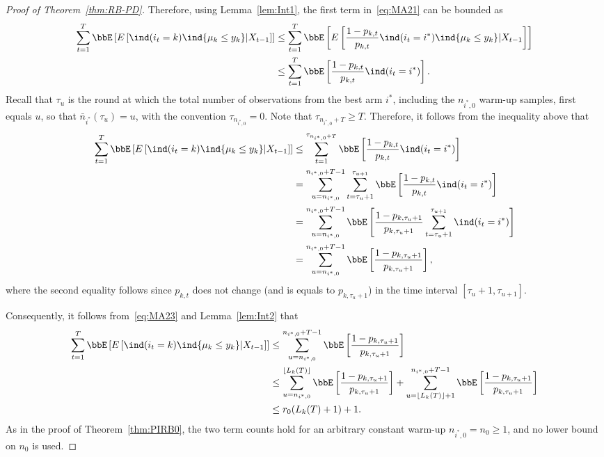 \documentclass[11pt]{article}
\begin{document}
\begin{proof}[Proof of Theorem~\ref{thm:RB-PD}]
    Therefore, using Lemma~\ref{lem:Int1}, the first term in~\eqref{eq:MA21} can be bounded as
    \begin{align}
        \nonumber
      \sum_{t=1}^{T} \bbE \left[ E\left[  \ind(i_t=k )  \ind\{\mu_k \leq y_k  \}  | X_{t-1}  \right] \right] &\leq \sum_{t=1}^{T} \bbE \left[ E\left[  \frac{1-p_{k,t}}{p_{k,t}} \ind(i_t=i^* )  \ind\{\mu_k \leq y_k  \}  | X_{t-1}  \right] \right]
      \\
      &\leq \sum_{t=1}^{T} \bbE \left[   \frac{1-p_{k,t}}{p_{k,t}} \ind(i_t=i^* )   \right].
    \end{align}
    Recall that $\tau_u$ is the round at which the total number of observations from the best arm $i^*$, including the $n_{i^*,0}$ warm-up samples, first equals $u$, so that $\bar n_{i^*}(\tau_u) = u$, with the convention $\tau_{n_{i^*,0}} = 0$. Note that $\tau_{n_{i^*,0}+T} \geq T$. Therefore, it follows from the inequality above that
    \begin{align}
        \nonumber
      \sum_{t=1}^{T} \bbE \left[ E\left[  \ind(i_t=k )  \ind\{\mu_k \leq y_k  \}  | X_{t-1}  \right] \right] &\leq \sum_{t=1}^{\tau_{n_{i^*,0}+T}} \bbE \left[   \frac{1-p_{k,t}}{p_{k,t}} \ind(i_t=i^* )   \right]
      \\
      \nonumber
      &= \sum_{u=n_{i^*,0}}^{n_{i^*,0}+T-1} \sum_{t=\tau_{u}+1}^{\tau_{u+1}}  \bbE \left[   \frac{1-p_{k,t}}{p_{k,t}}  \ind(i_t=i^* )   \right]
      \\
      \nonumber
      &= \sum_{u=n_{i^*,0}}^{n_{i^*,0}+T-1}  \bbE \left[   \frac{1-p_{k,\tau_{u}+1}}{p_{k,\tau_{u}+1}}  \sum_{t=\tau_{u}+1}^{\tau_{u+1}}  \ind(i_t=i^* )   \right]
      \\
      &= \sum_{u=n_{i^*,0}}^{n_{i^*,0}+T-1}  \bbE \left[   \frac{1-p_{k,\tau_{u}+1}}{p_{k,\tau_{u}+1}}     \right] ,
      \label{eq:MA23}
    \end{align}
    where the second equality follows since $p_{k,t}$ does not change (and is equals to $p_{k,\tau_{u}+1}$) in the time interval $[\tau_{u}+1,\tau_{u+1}]$. 

    Consequently, it follows from~\eqref{eq:MA23} and Lemma~\ref{lem:Int2} that
   \begin{align}
    \nonumber
    \sum_{t=1}^{T} \bbE \left[ E\left[  \ind(i_t=k )  \ind\{\mu_k \leq y_k  \}  | X_{t-1}  \right] \right] &\leq \sum_{u=n_{i^*,0}}^{n_{i^*,0}+T-1}  \bbE \left[   \frac{1-p_{k,\tau_{u}+1}}{p_{k,\tau_{u}+1}}     \right] 
    \\
    \nonumber
    &\leq \sum_{u=n_{i^*,0}}^{\lfloor L_k(T) \rfloor} \bbE \left[   \frac{1-p_{k,\tau_{u}+1}}{p_{k,\tau_{u}+1}}     \right]   + \sum_{u=\lfloor L_k(T) \rfloor + 1}^{n_{i^*,0}+T-1} \bbE \left[   \frac{1-p_{k,\tau_{u}+1}}{p_{k,\tau_{u}+1}}     \right]
    \\
    &\leq  r_0(L_k(T)+1) + 1.
    \label{eq:MA26} 
   \end{align} 
   As in the proof of Theorem~\ref{thm:PIRB0}, the two term counts hold for an arbitrary constant warm-up $n_{i^*,0}=n_0\geq1$, and no lower bound on $n_0$ is used.


\end{proof}
\end{document}
